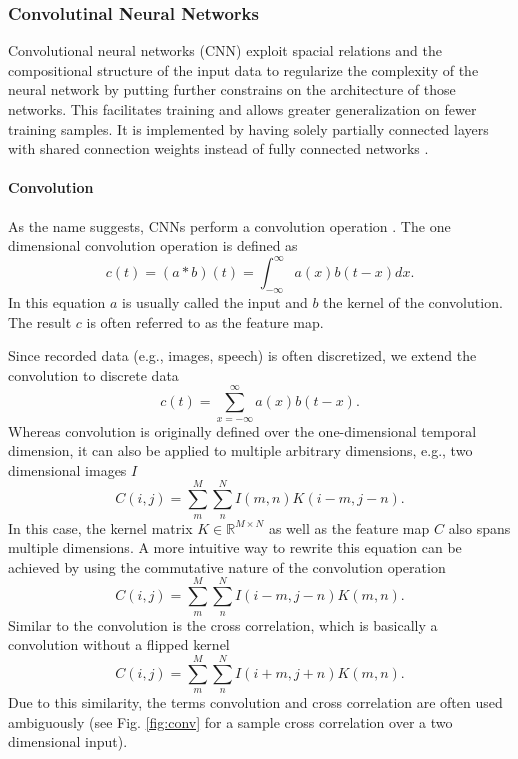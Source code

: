\subsubsection{Convolutinal Neural Networks} \label{c:cnns}

Convolutional neural networks (CNN) exploit spacial relations and the compositional structure of the input data to regularize the complexity of the neural network by putting further constrains on the architecture of those networks.
This facilitates training and allows greater generalization on fewer training samples.
It is implemented by having solely partially connected layers with shared connection weights instead of fully connected networks \cite{Goodfellow-et-al-2016-Book}\cite{lecun1989backpropagation}.    

\paragraph{Convolution} \label{c:convolution}

As the name suggests, CNNs perform a convolution operation \cite{Goodfellow-et-al-2016-Book}. The one dimensional convolution operation is defined as
\[
c(t) = (a * b)(t) = \int_{- \infty}^{\infty} a(x)b(t-x) dx.
\]
In this equation $a$ is usually called the input and $b$ the kernel of the convolution. The result $c$ is often referred to as the feature map.

Since recorded data (e.g., images, speech) is often discretized, we extend the convolution to discrete data
\[
c(t) = \sum_{x = - \infty}^{\infty} a(x)b(t-x).
\]
Whereas convolution is originally defined over the one-dimensional temporal dimension, it can also be applied to multiple arbitrary dimensions, e.g., two dimensional images $I$
\[
C(i,j) = \sum_m^M \sum_n^N I(m,n) K(i - m, j -n).
\]
In this case, the kernel matrix $K \in \mathbb{R}^{M \times N} $ as well as the feature map $C$ also spans multiple dimensions.
A more intuitive way to rewrite this equation can be achieved by using the commutative nature of the convolution operation
\[
C(i,j) = \sum_m^M \sum_n^N I(i - m,j - n) K(m, n).
\]
Similar to the convolution is the cross correlation, which is basically a convolution without a flipped kernel
\[
C(i,j) = \sum_m^M \sum_n^N I(i + m,j + n) K(m, n).
\]
Due to this similarity, the terms convolution and cross correlation are often used ambiguously (see Fig. \ref{fig:conv} for a sample cross correlation over a two dimensional input).

